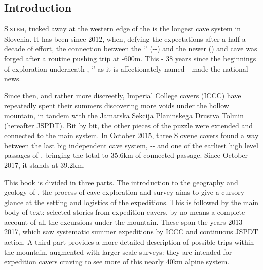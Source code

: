 \begin{tcolorbox} %
\vspace{60pt}
	\part{Introduction}
	\lettrine{S}{istem}, tucked away at the western edge of the  is the longest cave system in Slovenia. It has been since 2012, when, defying the expectations after a half a decade of effort, the connection between the ‘’ (--) and the newer  () and  cave was forged after a routine pushing trip at -600m. This - 38 years since the beginnings of exploration underneath , ‘’ as it is affectionately named - made the national news. 

Since then, and rather more discreetly,  Imperial College cavers (ICCC) have repeatedly spent their summers discovering more voids under the hollow mountain, in tandem with the Jamarska Sekcija Planinskega Drustva Tolmin (hereafter JSPDT). Bit by bit, the other pieces of the puzzle were extended and connected to the main system. In October 2015, three Slovene cavers found a way between the last big independent cave system, -- and one of the earliest high level passages of , bringing the total to 35.6km of connected passage. Since October 2017, it stands at 39.2km.

This book is divided in three parts. The introduction to the geography and geology of , the process of cave exploration and survey aims to give a cursory glance at the setting and logistics of the expeditions. This is followed by the main body of text: selected stories from expedition cavers, by no means a complete account of all the excursions under the mountain. These span the years 2013-2017, which saw systematic summer expeditions by ICCC and continuous JSPDT action. A third part provides a more detailed description of possible trips within the mountain, augmented with larger scale surveys: they are intended for expedition cavers craving to see more of this nearly 40km alpine system. 
\end{tcolorbox}
